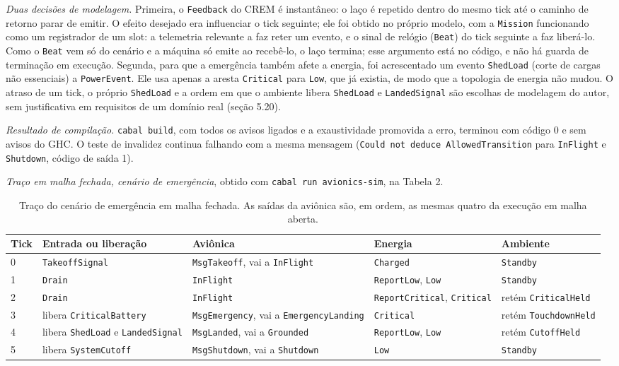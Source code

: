\documentclass[12pt,a4paper]{article}
\begin{document}
\textit{Duas decisões de modelagem.} Primeira, o \texttt{Feedback} do CREM é instantâneo: o laço é repetido dentro do mesmo tick até o caminho de retorno parar de emitir. O efeito desejado era influenciar o tick seguinte; ele foi obtido no próprio modelo, com a \texttt{Mission} funcionando como um registrador de um slot: a telemetria relevante a faz reter um evento, e o sinal de relógio (\texttt{Beat}) do tick seguinte a faz liberá-lo. Como o \texttt{Beat} vem só do cenário e a máquina só emite ao recebê-lo, o laço termina; esse argumento está no código, e não há guarda de terminação em execução. Segunda, para que a emergência também afete a energia, foi acrescentado um evento \texttt{ShedLoad} (corte de cargas não essenciais) a \texttt{PowerEvent}. Ele usa apenas a aresta \texttt{Critical} para \texttt{Low}, que já existia, de modo que a topologia de energia não mudou. O atraso de um tick, o próprio \texttt{ShedLoad} e a ordem em que o ambiente libera \texttt{ShedLoad} e \texttt{LandedSignal} são escolhas de modelagem do autor, sem justificativa em requisitos de um domínio real (seção 5.20).

\textit{Resultado de compilação.} \texttt{cabal build}, com todos os avisos ligados e a exaustividade promovida a erro, terminou com código 0 e sem avisos do GHC. O teste de invalidez continua falhando com a mesma mensagem (\texttt{Could not deduce AllowedTransition} para \texttt{InFlight} e \texttt{Shutdown}, código de saída 1).

\textit{Traço em malha fechada, cenário de emergência}, obtido com \texttt{cabal run avionics-sim}, na Tabela 2.

\begin{table}[h]
\centering
\scriptsize
\begin{tabular}{|p{0.7cm}|p{3.1cm}|p{4.1cm}|p{3.0cm}|p{2.9cm}|}
\hline
Tick & Entrada ou liberação & Aviônica & Energia & Ambiente \\
\hline
0 & \texttt{TakeoffSignal} & \texttt{MsgTakeoff}, vai a \texttt{InFlight} & \texttt{Charged} & \texttt{Standby} \\
\hline
1 & \texttt{Drain} & \texttt{InFlight} & \texttt{ReportLow}, \texttt{Low} & \texttt{Standby} \\
\hline
2 & \texttt{Drain} & \texttt{InFlight} & \texttt{ReportCritical}, \texttt{Critical} & retém \texttt{CriticalHeld} \\
\hline
3 & libera \texttt{CriticalBattery} & \texttt{MsgEmergency}, vai a \texttt{EmergencyLanding} & \texttt{Critical} & retém \texttt{TouchdownHeld} \\
\hline
4 & libera \texttt{ShedLoad} e \texttt{LandedSignal} & \texttt{MsgLanded}, vai a \texttt{Grounded} & \texttt{ReportLow}, \texttt{Low} & retém \texttt{CutoffHeld} \\
\hline
5 & libera \texttt{SystemCutoff} & \texttt{MsgShutdown}, vai a \texttt{Shutdown} & \texttt{Low} & \texttt{Standby} \\
\hline
\end{tabular}
\caption{Traço do cenário de emergência em malha fechada. As saídas da aviônica são, em ordem, as mesmas quatro da execução em malha aberta.}
\end{table}
\end{document}
